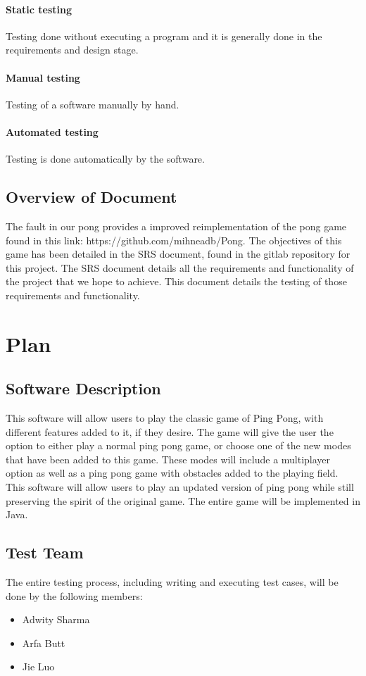 \documentclass[12pt,letterpaper]{article}
\begin{document}
	\paragraph{Static testing}		Testing done without executing a program and it is generally done in the requirements and design stage.
	\paragraph{Manual testing}	Testing of a software manually by hand.
	\paragraph{Automated testing}	Testing is done automatically by the software. 

	\subsection{Overview of Document}
	The fault in our pong provides a improved reimplementation of the pong game found in this link: https://github.com/mihneadb/Pong. The objectives of this game has been detailed in the SRS document, found in the gitlab repository for this project. The SRS document details all the requirements and functionality of the project that we hope to achieve. This document details the testing of those requirements and functionality.
	
	\section{Plan}
	\subsection{Software Description}
	This software will allow users to play the classic game of Ping Pong, with different features added to it, if they desire. The game will give the user the option to either play a normal ping pong game, or choose one of the new modes that have been added to this game. These modes will include a multiplayer option as well as a ping pong game with obstacles added to the playing field. This software will allow users to play an updated version of ping pong while still preserving the spirit of the original game. The entire game will be implemented in Java.

	\subsection{Test Team}
	The entire testing process, including writing and executing test cases, will be done by the following members:
	\begin{itemize}
	\item Adwity Sharma
	\item Arfa Butt
	\item Jie Luo
	\end{itemize}
\end{document}
